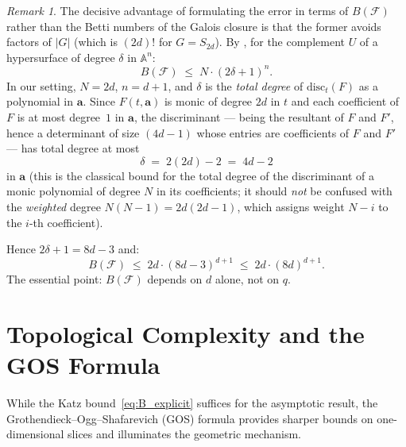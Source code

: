 \documentclass[11pt, a4paper]{article}
\theoremstyle{definition}
\theoremstyle{remark}
\newtheorem{remark}[theorem]{Remark}
\newcommand{\Affine}{\mathbb{A}}
\newcommand{\disc}{\mathrm{disc}}
\begin{document}
\begin{remark}\label{rem:betti_bound}
The decisive advantage of formulating the error in terms of
$B(\mathcal{F})$ rather than the Betti numbers of the
Galois closure is that the former avoids factors of $|G|$
(which is $(2d)!$ for $G = S_{2d}$).
By \cite[Thm.~12]{katz2001}, for the complement $U$ of a
hypersurface of degree $\delta$ in $\Affine^{n}$:
\begin{equation}\label{eq:katz_bound}
    B(\mathcal{F}) \;\le\; N \cdot (2\delta + 1)^{n}.
\end{equation}
In our setting, $N = 2d$, $n = d + 1$, and $\delta$ is the
\emph{total degree} of $\disc_t(F)$ as a polynomial in
$\mathbf{a}$.
Since $F(t,\mathbf{a})$ is monic of degree $2d$ in $t$ and each
coefficient of $F$ is at most degree~$1$ in $\mathbf{a}$, the
discriminant --- being the resultant of $F$ and $F'$, hence
a determinant of size $(4d-1)$ whose entries are
coefficients of $F$ and $F'$ --- has total degree at most
\begin{equation}\label{eq:delta}
    \delta \;=\; 2(2d) - 2 \;=\; 4d - 2
\end{equation}
in $\mathbf{a}$ (this is the classical bound for the total degree of
the discriminant of a monic polynomial of degree $N$ in its
coefficients; it should \emph{not} be confused with the
\emph{weighted} degree $N(N-1) = 2d(2d-1)$, which assigns
weight $N - i$ to the $i$-th coefficient).

Hence $2\delta + 1 = 8d - 3$ and:
\begin{equation}\label{eq:B_explicit}
    B(\mathcal{F})
    \;\le\;
    2d \cdot (8d - 3)^{d+1}
    \;\le\;
    2d \cdot (8d)^{d+1}.
\end{equation}
The essential point: $B(\mathcal{F})$ depends on $d$ alone,
not on $q$.
\end{remark}

\section{Topological Complexity and the GOS Formula}
\label{sec:GOS}

While the Katz bound~\eqref{eq:B_explicit} suffices for the
asymptotic result, the Grothendieck--Ogg--Shafarevich (GOS)
formula provides sharper bounds on one-dimensional slices and
illuminates the geometric mechanism.
\end{document}
